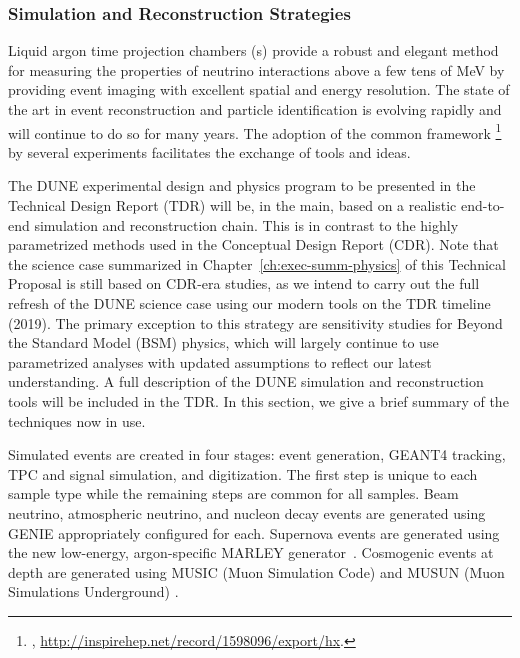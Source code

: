 \subsubsection{Simulation and Reconstruction Strategies}
\label{sec:exec-summ-strat-simreco}

Liquid argon time projection chambers (\lartpc{}s) provide a robust and elegant method for measuring the properties of neutrino interactions above a few tens of MeV by providing \threed event imaging with excellent spatial and energy resolution.  The state of the art in \lartpc event reconstruction and particle identification is evolving rapidly and will continue to do so for many years.  The adoption of the common framework \larsoft{}\footnote{\larsoft, \url{http://inspirehep.net/record/1598096/export/hx}.} by several \lartpc experiments facilitates the exchange of tools and ideas.

The DUNE experimental design and physics program to be presented in the Technical Design Report (TDR) will be, in the main, based on a realistic end-to-end simulation and reconstruction chain.  This is in contrast to the highly parametrized methods used in the Conceptual Design Report (CDR).  Note that the science case summarized in Chapter~\ref{ch:exec-summ-physics} of this Technical Proposal is still based on CDR-era studies, as we intend to carry out the full refresh of the DUNE science case using our modern tools on the TDR timeline (2019).  The primary exception to this strategy are sensitivity studies for Beyond the Standard Model (BSM) physics, which will largely continue to use parametrized analyses with updated assumptions to reflect our latest understanding.  A full description of the DUNE simulation and reconstruction tools will be included in the TDR.  In this section, we give a brief summary of the techniques now in use.

Simulated events are created in four stages: event generation, {\sc GEANT4} tracking, TPC and  signal simulation, and digitization.  The first step is unique to each sample type while the remaining steps are common for all samples. Beam neutrino, atmospheric neutrino, and nucleon decay events are generated using {\sc GENIE} appropriately configured for each.  Supernova events are generated using the new low-energy, argon-specific MARLEY generator~\cite{marley}.  Cosmogenic events at depth are generated using MUSIC (Muon Simulation Code) \cite{MUSICPaper} and MUSUN (Muon Simulations Underground) \cite{Kudryavtsev:musun}.

